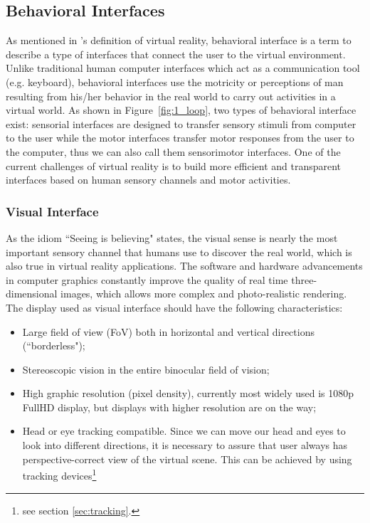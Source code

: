 \subsection{Behavioral Interfaces}
As mentioned in \citet{Fuchs2011Book}'s definition of virtual reality, behavioral interface is a term to describe a type of interfaces that connect the user to the virtual environment. Unlike traditional human computer interfaces which act as a communication tool (e.g. keyboard), behavioral interfaces use the motricity or perceptions of man resulting from his/her behavior in the real world to carry out activities in a virtual world. As shown in Figure~\ref{fig:1_loop}, two types of behavioral interface exist: sensorial interfaces are designed to transfer sensory stimuli from computer to the user while the motor interfaces transfer motor responses from the user to the computer, thus we can also call them sensorimotor interfaces. One of the current challenges of virtual reality is to build more efficient and transparent interfaces based on human sensory channels and motor activities.

\subsubsection{Visual Interface}
As the idiom ``Seeing is believing" states, the visual sense is nearly the most important sensory channel that humans use to discover the real world, which is also true in virtual reality applications. The software and hardware advancements in computer graphics constantly improve the quality of real time three-dimensional images, which allows more complex and photo-realistic rendering. The display used as visual interface should have the following characteristics:

\begin{itemize}
\item Large field of view (FoV) both in horizontal and vertical directions (``borderless");
\item Stereoscopic vision in the entire binocular field of vision;
\item High graphic resolution (pixel density), currently most widely used is 1080p FullHD display, but displays with higher resolution are on the way;
\item Head or eye tracking compatible. Since we can move our head and eyes to look into different directions, it is necessary to assure that user always has perspective-correct view of the virtual scene. This can be achieved by using tracking devices\footnote{see section \ref{sec:tracking}.}
\end{itemize}

